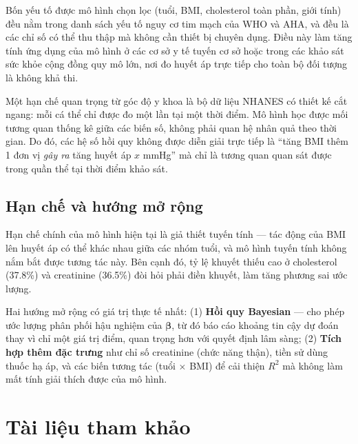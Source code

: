 \documentclass[12pt,a4paper]{article}
\begin{document}
Bốn yếu tố được mô hình chọn lọc (tuổi, BMI, cholesterol toàn phần, giới tính) đều nằm trong danh sách yếu tố nguy cơ tim mạch của WHO và AHA, và đều là các chỉ số có thể thu thập mà không cần thiết bị chuyên dụng. Điều này làm tăng tính ứng dụng của mô hình ở các cơ sở y tế tuyến cơ sở hoặc trong các khảo sát sức khỏe cộng đồng quy mô lớn, nơi đo huyết áp trực tiếp cho toàn bộ đối tượng là không khả thi.

Một hạn chế quan trọng từ góc độ y khoa là bộ dữ liệu NHANES có thiết kế cắt ngang: mỗi cá thể chỉ được đo một lần tại một thời điểm. Mô hình học được mối tương quan thống kê giữa các biến số, không phải quan hệ nhân quả theo thời gian. Do đó, các hệ số hồi quy không được diễn giải trực tiếp là ``tăng BMI thêm 1 đơn vị \emph{gây ra} tăng huyết áp $x$ mmHg'' mà chỉ là tương quan quan sát được trong quần thể tại thời điểm khảo sát.

\subsection{Hạn chế và hướng mở rộng}

Hạn chế chính của mô hình hiện tại là giả thiết tuyến tính — tác động của BMI lên huyết áp có thể khác nhau giữa các nhóm tuổi, và mô hình tuyến tính không nắm bắt được tương tác này. Bên cạnh đó, tỷ lệ khuyết thiếu cao ở cholesterol (37.8\%) và creatinine (36.5\%) đòi hỏi phải điền khuyết, làm tăng phương sai ước lượng.

Hai hướng mở rộng có giá trị thực tế nhất: (1) \textbf{Hồi quy Bayesian} — cho phép ước lượng phân phối hậu nghiệm của $\boldsymbol{\beta}$, từ đó báo cáo khoảng tin cậy dự đoán thay vì chỉ một giá trị điểm, quan trọng hơn với quyết định lâm sàng; (2) \textbf{Tích hợp thêm đặc trưng} như chỉ số creatinine (chức năng thận), tiền sử dùng thuốc hạ áp, và các biến tương tác (tuổi $\times$ BMI) để cải thiện $R^2$ mà không làm mất tính giải thích được của mô hình.

\section{Tài liệu tham khảo}
\end{document}
